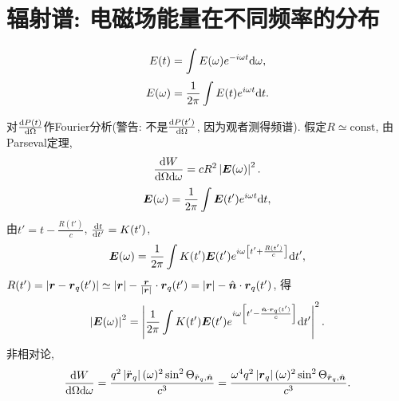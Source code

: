 \section{辐射谱: 电磁场能量在不同频率的分布}

\begin{equation}
    E(t)=\int E(\omega)e^{-i\omega t}\mathrm{d}\omega,
\end{equation}
\begin{equation}
    E(\omega)=\frac{1}{2\pi}\int E(t)e^{i\omega t}\mathrm{d} t.
\end{equation}

对$\frac{\mathrm{d} P(t)}{\mathrm{d} \Omega}$作Fourier分析(警告: 不是$\frac{\mathrm{d} P(t')}{\mathrm{d} \Omega}$, 因为观者测得频谱). 假定$R\simeq\text{const}$, 由Parseval定理,
\begin{equation}
    \frac{\mathrm{d} W}{\mathrm{d}\Omega\mathrm{d}\omega}=cR^2\left\lvert\boldsymbol{E}(\omega)\right\rvert^2.
\end{equation}
\begin{equation}
    \boldsymbol{E}(\omega)=\frac{1}{2\pi}\int \boldsymbol{E}(t')e^{i\omega t}\mathrm{d} t,
\end{equation}
由$t'=t-\frac{R(t')}{c}$, $\frac{\mathrm{d} t}{\mathrm{d} t'}=K(t')$,
\begin{equation}
    \boldsymbol{E}(\omega)=\frac{1}{2\pi}\int K(t')\boldsymbol{E}(t')e^{i\omega \left[t'+\frac{R(t')}{c}\right]}\mathrm{d} t',
\end{equation}
$R(t')=\left\lvert\boldsymbol{r}-\boldsymbol{r}_q(t')\right\rvert\simeq\left\lvert\boldsymbol{r}\right\rvert-\frac{\boldsymbol{r}}{\left\lvert\boldsymbol{r}\right\rvert}\cdot\boldsymbol{r}_q(t')=\left\lvert\boldsymbol{r}\right\rvert-\hat{\boldsymbol{n}}\cdot\boldsymbol{r}_q(t')$, 得
\begin{equation}
    \left\lvert\boldsymbol{E}(\omega)\right\rvert^2=
    \left\lvert\frac{1}{2\pi}\int K(t')\boldsymbol{E}(t')e^{i\omega \left[t'-\frac{\hat{\boldsymbol{n}}\cdot\boldsymbol{r}_q(t')}{c}\right]}\mathrm{d} t'\right\rvert^2.
\end{equation}
非相对论,
\begin{equation}
    \frac{\mathrm{d} W}{\mathrm{d}\Omega\mathrm{d}\omega}
    =\frac{q^2\left\lvert{\ddot{\boldsymbol{r}}}_q\right\rvert(\omega)^2\sin^2
    \Theta_{\ddot{\boldsymbol{r}}_q,\hat{\boldsymbol{n}}}}{c^3}
    =\frac{\omega^4q^2\left\lvert{\boldsymbol{r}}_q\right\rvert(\omega)^2\sin^2
    \Theta_{\ddot{\boldsymbol{r}}_q,\hat{\boldsymbol{n}}}}{c^3}.
\end{equation}

